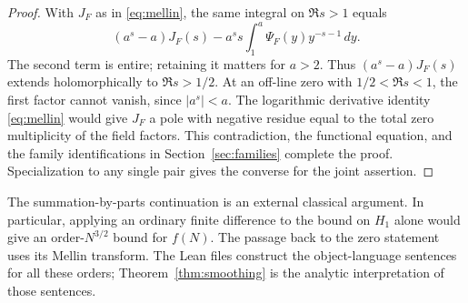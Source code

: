 \begin{proof}
With $J_F$ as in \eqref{eq:mellin}, the same integral on $\Re s>1$ equals
\[
  (a^s-a)J_F(s)-a^s s\int_1^a\Psi_F(y)y^{-s-1}\,dy .
\]
The second term is entire; retaining it matters for $a>2$. Thus $(a^s-a)J_F(s)$ extends holomorphically to $\Re s>1/2$. At an off-line zero with $1/2<\Re s<1$, the first factor cannot vanish, since $|a^s|<a$. The logarithmic derivative identity \eqref{eq:mellin} would give $J_F$ a pole with negative residue equal to the total zero multiplicity of the field factors. This contradiction, the functional equation, and the family identifications in Section~\ref{sec:families} complete the proof. Specialization to any single pair gives the converse for the joint assertion.
\end{proof}

The summation-by-parts continuation is an external classical argument. In particular, applying an ordinary finite difference to the bound on $H_1$ alone would give an order-$N^{3/2}$ bound for $f(N)$. The passage back to the zero statement uses its Mellin transform. The Lean files construct the object-language sentences for all these orders; Theorem~\ref{thm:smoothing} is the analytic interpretation of those sentences.
